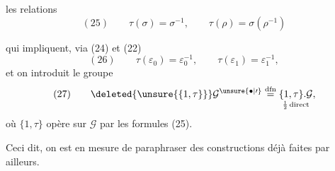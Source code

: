 
les relations
\[
(25)\qquad
\tau(\sigma)=\sigma^{-1},\qquad
\tau(\rho)=\sigma(\rho^{-1})
\]


qui impliquent, via (24) et (22)
\[
(26)\qquad
\tau(\varepsilon_0)=\varepsilon_0^{-1},\qquad
\tau(\varepsilon_1)=\varepsilon_1^{-1},
\]
et on introduit le groupe
\[
(27)\qquad
\deleted{\unsure{\{1,\tau\}}}
\mathcal{G}^{\unsure{\bullet|\prime}}
\overset{\mathrm{dfn}}{=}
\underset{\frac12\,\text{direct}}{\{1,\tau\}.\mathcal{G}},
\]
où $\{1,\tau\}$ opère sur $\mathcal{G}$ par les formules (25).

Ceci dit, on est en mesure de paraphraser des constructions
déjà faites par ailleurs.

